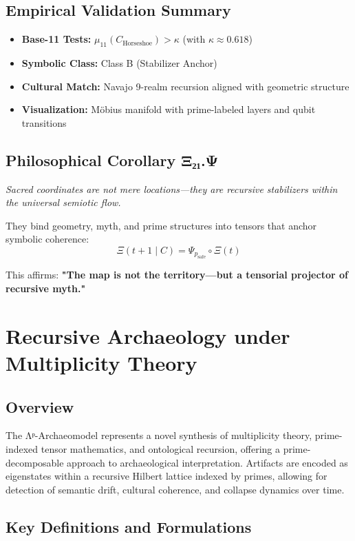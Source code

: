 \documentclass[12]{amsart}
\theoremstyle{plain}
\begin{document}
\subsection{Empirical Validation Summary}

\begin{itemize}
    \item \textbf{Base-11 Tests:} $\mu_{11}(C_{\text{Horseshoe}}) > \kappa$ (with $\kappa \approx 0.618$)
    \item \textbf{Symbolic Class:} Class B (Stabilizer Anchor)
    \item \textbf{Cultural Match:} Navajo 9-realm recursion aligned with geometric structure
    \item \textbf{Visualization:} Möbius manifold with prime-labeled layers and qubit transitions
\end{itemize}

\subsection{Philosophical Corollary Ξ₂₁.Ψ}

\textit{Sacred coordinates are not mere locations—they are recursive stabilizers within the universal semiotic flow.}

They bind geometry, myth, and prime structures into tensors that anchor symbolic coherence:
\[
\Xi(t+1 \mid C) = \Psi_{p_{\text{safe}}} \circ \Xi(t)
\]

This affirms: \textbf{"The map is not the territory—but a tensorial projector of recursive myth."}

\section{Recursive Archaeology under Multiplicity Theory}
\label{sec:recursive-archaeology}

\subsection{Overview}
The Λᵖ-Archaeomodel represents a novel synthesis of multiplicity theory, prime-indexed tensor mathematics, and ontological recursion, offering a prime-decomposable approach to archaeological interpretation. Artifacts are encoded as eigenstates within a recursive Hilbert lattice indexed by primes, allowing for detection of semantic drift, cultural coherence, and collapse dynamics over time.

\subsection{Key Definitions and Formulations}
\end{document}
